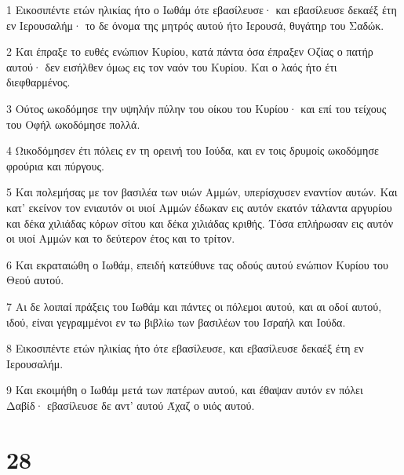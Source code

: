 \par 1 Εικοσιπέντε ετών ηλικίας ήτο ο Ιωθάμ ότε εβασίλευσε· και εβασίλευσε δεκαέξ έτη εν Ιερουσαλήμ· το δε όνομα της μητρός αυτού ήτο Ιερουσά, θυγάτηρ του Σαδώκ.
\par 2 Και έπραξε το ευθές ενώπιον Κυρίου, κατά πάντα όσα έπραξεν Οζίας ο πατήρ αυτού· δεν εισήλθεν όμως εις τον ναόν του Κυρίου. Και ο λαός ήτο έτι διεφθαρμένος.
\par 3 Ούτος ωκοδόμησε την υψηλήν πύλην του οίκου του Κυρίου· και επί του τείχους του Οφήλ ωκοδόμησε πολλά.
\par 4 Ωικοδόμησεν έτι πόλεις εν τη ορεινή του Ιούδα, και εν τοις δρυμοίς ωκοδόμησε φρούρια και πύργους.
\par 5 Και πολεμήσας με τον βασιλέα των υιών Αμμών, υπερίσχυσεν εναντίον αυτών. Και κατ' εκείνον τον ενιαυτόν οι υιοί Αμμών έδωκαν εις αυτόν εκατόν τάλαντα αργυρίου και δέκα χιλιάδας κόρων σίτου και δέκα χιλιάδας κριθής. Τόσα επλήρωσαν εις αυτόν οι υιοί Αμμών και το δεύτερον έτος και το τρίτον.
\par 6 Και εκραταιώθη ο Ιωθάμ, επειδή κατεύθυνε τας οδούς αυτού ενώπιον Κυρίου του Θεού αυτού.
\par 7 Αι δε λοιπαί πράξεις του Ιωθάμ και πάντες οι πόλεμοι αυτού, και αι οδοί αυτού, ιδού, είναι γεγραμμένοι εν τω βιβλίω των βασιλέων του Ισραήλ και Ιούδα.
\par 8 Εικοσιπέντε ετών ηλικίας ήτο ότε εβασίλευσε, και εβασίλευσε δεκαέξ έτη εν Ιερουσαλήμ.
\par 9 Και εκοιμήθη ο Ιωθάμ μετά των πατέρων αυτού, και έθαψαν αυτόν εν πόλει Δαβίδ· εβασίλευσε δε αντ' αυτού Άχαζ ο υιός αυτού.

\chapter{28}

